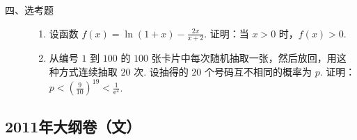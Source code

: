 \begin{description}
\begin{enumerate}[leftmargin=5pt]
    \end{enumerate}

\end{description}

\begin{description}

    \item[四、选考题]

    \begin{enumerate}[leftmargin=5pt]

      \addtocounter{enumi}{+21}

        \item [A]
设函数 \( f(x) = \ln (1 + x) - \frac{2x}{x + 2} \). 证明：当 \( x > 0 \) 时，\( f(x) > 0 \).

        \item [B]
从编号 \(1\) 到 \(100\) 的 \(100\) 张卡片中每次随机抽取一张，然后放回，用这种方式连续抽取 \(20\) 次. 设抽得的 \(20\) 个号码互不相同的概率为 \(p\). 证明：\(p < \left(\frac{9}{10}\right)^{19} < \frac{1}{{\mathrm{e}}^2}\).

    \end{enumerate}

\end{description}


\subsection{2011年大纲卷（文）}\label{gk:2011年大纲卷（文）}

